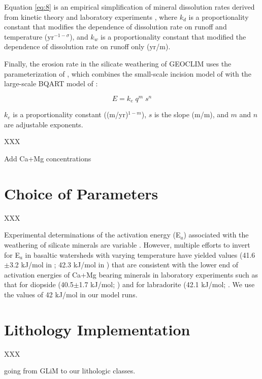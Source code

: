\documentclass[11pt,letterpaper]{article}
\begin{document}
\noindent
Equation \ref{eq:8} is an empirical simplification of mineral dissolution rates derived from kinetic theory and laboratory experiments \citet{West2012a}, where $k_{d}$ is a proportionality constant that modifies the dependence of dissolution rate on runoff and temperature (yr$^{-1-\sigma}$), and $k_{w}$ is a proportionality constant that modified the dependence of dissolution rate on runoff only (yr/m).

Finally, the erosion rate in the silicate weathering of GEOCLIM uses the parameterization of \citet{Maffre2018a}, which combines the small-scale incision model of \citet{Davy2000a} with the large-scale BQART model of \citet{Syvitski2007a}:

\begin{equation}
    E = k_{e}\;q^{m}\;s^{n}
    \label{eq:9}
\end{equation}

\noindent
$k_{e}$ is a proportionality constant ((m/yr)$^{1-m}$), $s$ is the slope (m/m), and $m$ and $n$ are adjustable exponents.

XXX

Add Ca+Mg concentrations

\section*{Choice of Parameters}

XXX

Experimental determinations of the activation energy (E$_a$) associated with the weathering of silicate minerals are variable \citep{Brantley2003a}. However, multiple efforts to invert for E$_a$ in basaltic watersheds with varying temperature have yielded values (41.6$\pm$3.2 kJ/mol in \citealp{Li2016a}; 42.3 kJ/mol in \citealp{Dessert2001a}) that are consistent with the lower end of activation energies of Ca+Mg bearing minerals in laboratory experiments such as that for diopside (40.5$\pm$1.7 kJ/mol; \citealp{Knauss1993a}) and for labradorite (42.1 kJ/mol; \citealp{Carroll2005a}. We use the values of 42 kJ/mol in our model runs.

\section*{Lithology Implementation}

XXX

going from GLiM to our lithologic classes.

\clearpage

\singlespacing

\newpage



\end{document}
